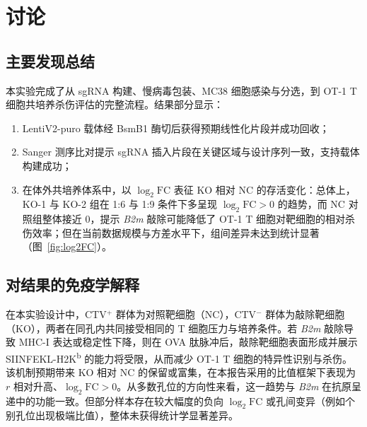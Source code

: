 \section{讨论}
\label{sec:discussion}

\subsection{主要发现总结}
本实验完成了从 sgRNA 构建、慢病毒包装、MC38 细胞感染与分选，到 OT-1 T 细胞共培养杀伤评估的完整流程。结果部分显示：
\begin{enumerate}
    \item LentiV2-puro 载体经 BsmB1 酶切后获得预期线性化片段并成功回收；
    \item Sanger 测序比对提示 sgRNA 插入片段在关键区域与设计序列一致，支持载体构建成功；
    \item 在体外共培养体系中，以 $\log_2\mathrm{FC}$ 表征 KO 相对 NC 的存活变化：总体上，KO-1 与 KO-2 组在 1:6 与 1:9 条件下多呈现 $\log_2\mathrm{FC}>0$ 的趋势，而 NC 对照组整体接近 0，提示 \textit{B2m} 敲除可能降低了 OT-1 T 细胞对靶细胞的相对杀伤效率；但在当前数据规模与方差水平下，组间差异未达到统计显著（图~\ref{fig:log2FC}）。
\end{enumerate}

\subsection{对结果的免疫学解释}
在本实验设计中，CTV$^+$ 群体为对照靶细胞（NC），CTV$^-$ 群体为敲除靶细胞（KO），两者在同孔内共同接受相同的 T 细胞压力与培养条件。若 \textit{B2m} 敲除导致 MHC-I 表达或稳定性下降，则在 OVA 肽脉冲后，敲除靶细胞表面形成并展示 SIINFEKL-H2K\textsuperscript{b} 的能力将受限，从而减少 OT-1 T 细胞的特异性识别与杀伤。该机制预期带来 KO 相对 NC 的保留或富集，在本报告采用的比值框架下表现为 $r$ 相对升高、$\log_2\mathrm{FC}>0$。从多数孔位的方向性来看，这一趋势与 \textit{B2m} 在抗原呈递中的功能一致。但部分样本存在较大幅度的负向 $\log_2\mathrm{FC}$ 或孔间变异（例如个别孔位出现极端比值），整体未获得统计学显著差异。

